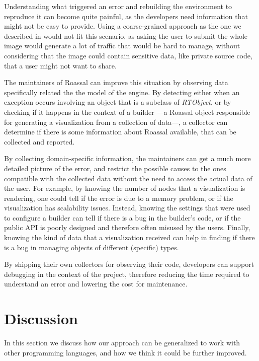 Understanding what triggered an error and rebuilding the environment to reproduce it can become quite painful, as the developers need information that might not be easy to provide.
Using a coarse-grained approach as the one we described in  would not fit this scenario, as asking the user to submit the whole image would generate a lot of traffic that would be hard to manage, without considering that the image could contain sensitive data, like private source code, that a user might not want to share.

The maintainers of Roassal can improve this situation by observing data specifically related the the model of the engine.
By detecting either when an exception occurs involving an object that is a subclass of \textit{RTObject}, or by checking if it happens in the context of a builder ---a Roassal object responsible for generating a visualization from a collection of data---, a collector can determine if there is some information about Roassal available, that can be collected and reported.

By collecting domain-specific information, the maintainers can get a much more detailed picture of the error, and restrict the possible causes to the ones compatible with the collected data without the need to access the actual data of the user.
For example, by knowing the number of nodes that a visualization is rendering, one could tell if the error is due to a memory problem, or if the visualization has scalability issues.
Instead, knowing the settings that were used to configure a builder can tell if there is a bug in the builder's code, or if the public API is poorly designed and therefore often misused by the users.
Finally, knowing the kind of data that a visualization received can help in finding if there is a bug in managing objects of different (specific) types.

By shipping their own collectors for observing their code, developers can support debugging in the context of the project, therefore reducing the time required to understand an error and lowering the cost for maintenance.



\section{Discussion}\label{sec:reified-discussion}

In this section we discuss how our approach can be generalized to work with other programming languages, and how we think it could be further improved.

